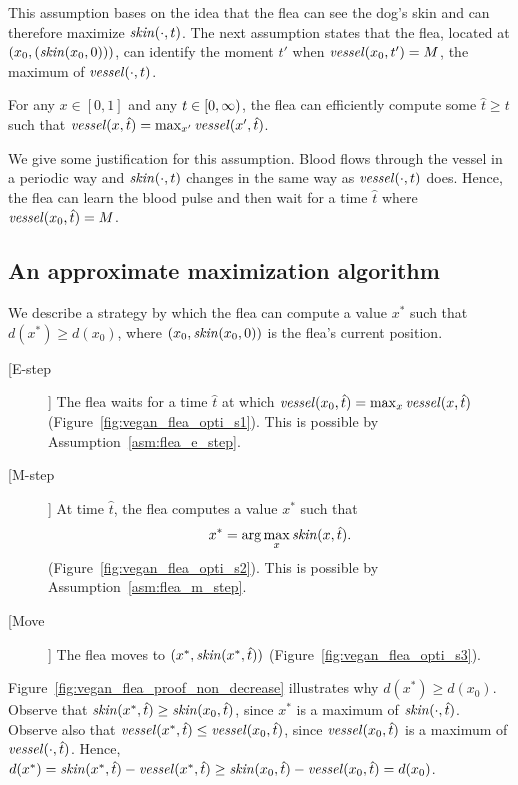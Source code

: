 This assumption bases on the idea that the flea can see the dog's skin and can therefore maximize $\mathit{skin}(\cdot, t)$. The next assumption states that the flea, located at $(x_0, (\mathit{skin}(x_0, 0)))$, can identify the moment $t'$ when $\mathit{vessel}(x_0, t') = M$, the maximum of $\mathit{vessel}(\cdot, t)$. 

\begin{assumption}
For any $x \in [0, 1]$ and any $t \in [0, \infty)$, the flea can efficiently compute some $\hat{t} \geq t$ such that $\mathit{vessel}(x, \hat{t}) = \max_{x'}\mathit{vessel}(x', \hat{t})$.
\label{asm:flea_e_step}
\end{assumption}
%
We give some justification for this assumption. Blood flows through the vessel in a periodic way and $\mathit{skin}(\cdot, t)$ changes in the same way as $\mathit{vessel}(\cdot, t)$ does. Hence, the flea can learn the blood pulse and then wait for a time $\hat{t}$ where $\mathit{vessel}(x_0, \hat{t}) = M$.

\subsection{An approximate maximization algorithm}
\label{sub:approx_max_algo}

We describe a strategy by which the flea can compute a value $x^*$ such that $d(x^*) \geq d(x_0)$, where $(x_0, \mathit{skin}(x_0, 0))$ is the flea's current position.
%
\begin{description}
\item[[E-step]] The flea waits for a time $\hat{t}$ at which $\mathit{vessel}(x_0, \hat{t}) = \max_x\mathit{vessel}(x, \hat{t})$ (Figure~\ref{fig:vegan_flea_opti_s1}). This is possible by Assumption~\ref{asm:flea_e_step}.
\item[[M-step]] At time $\hat{t}$, the flea computes a value $x^*$ such that 
%
$$x^* = \arg\max_{x} \mathit{skin}(x, \hat{t}).$$
%
(Figure~\ref{fig:vegan_flea_opti_s2}). This is possible by Assumption~\ref{asm:flea_m_step}.
\item[[Move]] The flea moves to $(x^*, \mathit{skin}(x^*, \hat{t}))$ (Figure~\ref{fig:vegan_flea_opti_s3}). 
\end{description}
%
Figure~\ref{fig:vegan_flea_proof_non_decrease} illustrates why $d(x^*) \geq d(x_0)$. Observe that $\mathit{skin}(x^*, \hat{t}) \geq \mathit{skin}(x_0, \hat{t})$, since $x^*$ is a maximum of $\mathit{skin}(\cdot, \hat{t})$. Observe also that $\mathit{vessel}(x^*, \hat{t}) \leq \mathit{vessel}(x_0, \hat{t})$, since $\mathit{vessel}(x_0, \hat{t})$ is a maximum of $\mathit{vessel}(\cdot, \hat{t})$. Hence, $d(x^*) = \mathit{skin}(x^*, \hat{t}) - \mathit{vessel}(x^*, \hat{t}) \geq \mathit{skin}(x_0, \hat{t}) - \mathit{vessel}(x_0, \hat{t}) = d(x_0)$.

